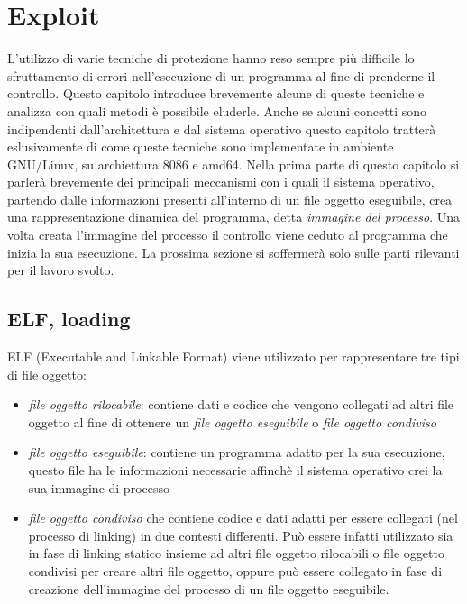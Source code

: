 \chapter{Exploit}

L'utilizzo di varie tecniche di protezione hanno reso sempre più
difficile lo sfruttamento di errori nell'esecuzione di un programma al
fine di prenderne il controllo. Questo capitolo introduce brevemente
alcune di queste tecniche e analizza con quali metodi è possibile
eluderle. Anche se alcuni concetti sono indipendenti dall'architettura
e dal sistema operativo questo capitolo tratterà eslusivamente di come
queste tecniche sono implementate in ambiente GNU/Linux, su
archiettura 8086 e amd64. Nella prima parte di questo capitolo si
parlerà brevemente dei principali meccanismi con i quali il sistema
operativo, partendo dalle informazioni presenti all'interno di un file
oggetto eseguibile, crea una rappresentazione dinamica del programma,
detta \emph{immagine del processo}. Una volta creata l'immagine del
processo il controllo viene ceduto al programma che inizia la sua
esecuzione. La prossima sezione si soffermerà solo sulle parti
rilevanti per il lavoro svolto.

\section{ELF, loading}

ELF (Executable and Linkable Format) viene utilizzato per 
rappresentare tre tipi di file oggetto:

\begin{itemize}
  \item \emph{file oggetto rilocabile}: contiene dati e codice che
    vengono collegati ad altri file oggetto al fine di ottenere un
    \emph{file oggetto eseguibile} o \emph{file oggetto condiviso}

  \item \emph{file oggetto eseguibile}: contiene un programma adatto per la
    sua esecuzione, questo file ha le informazioni necessarie affinchè
    il sistema operativo crei la sua immagine di processo

  \item \emph{file oggetto condiviso} che contiene codice e dati
    adatti per essere collegati (nel processo di linking) in due
    contesti differenti. Può essere infatti utilizzato sia in fase di
    linking statico insieme ad altri file oggetto rilocabili o file
    oggetto condivisi per creare altri file oggetto, oppure può essere
    collegato in fase di creazione dell'immagine del processo di un
    file oggetto eseguibile.
\end{itemize}


